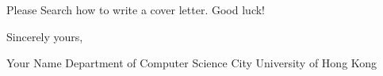 \documentclass{article}
\begin{document}
Please Search how to write a cover letter.
Good luck!

\bigskip %

Sincerely yours,

\vspace{20pt} %

Your Name
Department of Computer Science
City University of Hong Kong
\end{document}
